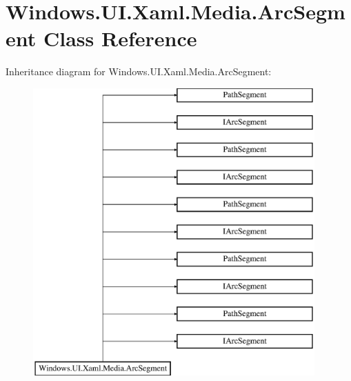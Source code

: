 \hypertarget{class_windows_1_1_u_i_1_1_xaml_1_1_media_1_1_arc_segment}{}\section{Windows.\+U\+I.\+Xaml.\+Media.\+Arc\+Segment Class Reference}
\label{class_windows_1_1_u_i_1_1_xaml_1_1_media_1_1_arc_segment}
Inheritance diagram for Windows.\+U\+I.\+Xaml.\+Media.\+Arc\+Segment\+:\begin{figure}[H]
\begin{center}
\leavevmode
\includegraphics[height=11.000000cm]{class_windows_1_1_u_i_1_1_xaml_1_1_media_1_1_arc_segment}
\end{center}
\end{figure}
